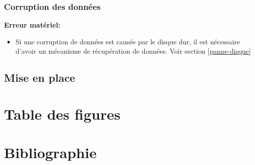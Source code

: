 \documentclass[12pt]{article}
\begin{document}
\subsubsection{Corruption des données}
\hspace{16pt}\textbf{Erreur matériel:} 
\justify
\begin{itemize}
	\item Si une corruption de données est causée par le disque dur, il est nécessaire d'avoir un mécanisme de récupération de données. Voir section \ref{panne-disque}
\end{itemize}

\newpage
\subsection{Mise en place}

\newpage


\section*{Table des figures}
\makeatletter
{}%
\makeatother
{}%


\nocite{*}
\section*{Bibliographie}

\printbibliography[heading=none]

%

\end{document}
